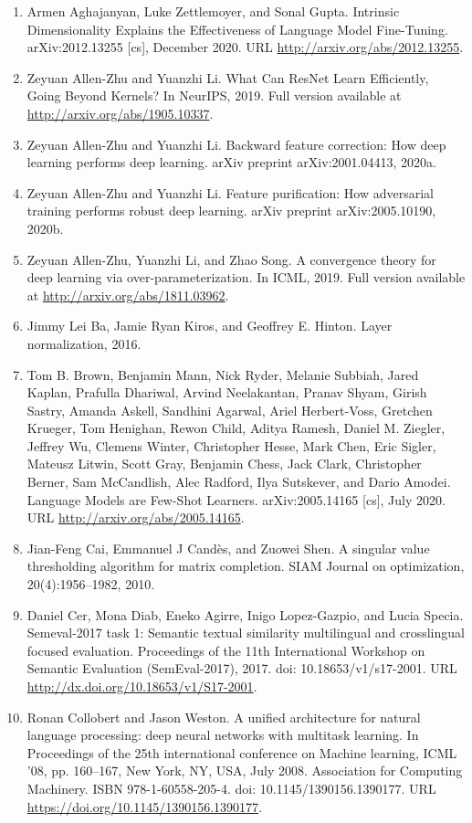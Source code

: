 \documentclass[11pt,UTF8,fontset=fandol]{ctexart}
\begin{document}
\begin{enumerate}[leftmargin=2em,itemsep=2pt]
\item Armen Aghajanyan, Luke Zettlemoyer, and Sonal Gupta. Intrinsic Dimensionality Explains the Effectiveness of Language Model Fine-Tuning. arXiv:2012.13255 [cs], December 2020. URL \url{http://arxiv.org/abs/2012.13255}.
\item Zeyuan Allen-Zhu and Yuanzhi Li. What Can ResNet Learn Efficiently, Going Beyond Kernels? In NeurIPS, 2019. Full version available at \url{http://arxiv.org/abs/1905.10337}.
\item Zeyuan Allen-Zhu and Yuanzhi Li. Backward feature correction: How deep learning performs deep learning. arXiv preprint arXiv:2001.04413, 2020a.
\item Zeyuan Allen-Zhu and Yuanzhi Li. Feature purification: How adversarial training performs robust deep learning. arXiv preprint arXiv:2005.10190, 2020b.
\item Zeyuan Allen-Zhu, Yuanzhi Li, and Zhao Song. A convergence theory for deep learning via over-parameterization. In ICML, 2019. Full version available at \url{http://arxiv.org/abs/1811.03962}.
\item Jimmy Lei Ba, Jamie Ryan Kiros, and Geoffrey E. Hinton. Layer normalization, 2016.
\item Tom B. Brown, Benjamin Mann, Nick Ryder, Melanie Subbiah, Jared Kaplan, Prafulla Dhariwal, Arvind Neelakantan, Pranav Shyam, Girish Sastry, Amanda Askell, Sandhini Agarwal, Ariel Herbert-Voss, Gretchen Krueger, Tom Henighan, Rewon Child, Aditya Ramesh, Daniel M. Ziegler, Jeffrey Wu, Clemens Winter, Christopher Hesse, Mark Chen, Eric Sigler, Mateusz Litwin, Scott Gray, Benjamin Chess, Jack Clark, Christopher Berner, Sam McCandlish, Alec Radford, Ilya Sutskever, and Dario Amodei. Language Models are Few-Shot Learners. arXiv:2005.14165 [cs], July 2020. URL \url{http://arxiv.org/abs/2005.14165}.
\item Jian-Feng Cai, Emmanuel J Cand\`es, and Zuowei Shen. A singular value thresholding algorithm for matrix completion. SIAM Journal on optimization, 20(4):1956--1982, 2010.
\item Daniel Cer, Mona Diab, Eneko Agirre, Inigo Lopez-Gazpio, and Lucia Specia. Semeval-2017 task 1: Semantic textual similarity multilingual and crosslingual focused evaluation. Proceedings of the 11th International Workshop on Semantic Evaluation (SemEval-2017), 2017. doi: 10.18653/v1/s17-2001. URL \url{http://dx.doi.org/10.18653/v1/S17-2001}.
\item Ronan Collobert and Jason Weston. A unified architecture for natural language processing: deep neural networks with multitask learning. In Proceedings of the 25th international conference on Machine learning, ICML '08, pp. 160--167, New York, NY, USA, July 2008. Association for Computing Machinery. ISBN 978-1-60558-205-4. doi: 10.1145/1390156.1390177. URL \url{https://doi.org/10.1145/1390156.1390177}.

\end{enumerate}
\end{document}
